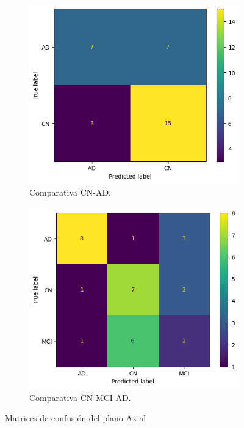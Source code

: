 \begin{figure}[H]
    \centering
    \begin{subfigure}{0.4\textwidth}
        \includegraphics[width=\textwidth]{./imgs/resultados/axial/CN_AD_cm_AXIAL}
        \caption{Comparativa CN-AD. }
        \label{fig:mc-axial-cn-ad}
    \end{subfigure}
    \hspace*{\fill}
    \begin{subfigure}{0.4\textwidth}
        \includegraphics[width=\textwidth]{./imgs/resultados/axial/CN_MCI_AD_cm_AXIAL}
        \caption{Comparativa CN-MCI-AD. }
        \label{fig:mc-axial-cn-mci-ad}
    \end{subfigure}
    \caption{Matrices de confusión del plano Axial} \label{fig:mc-axial}
\end{figure}

